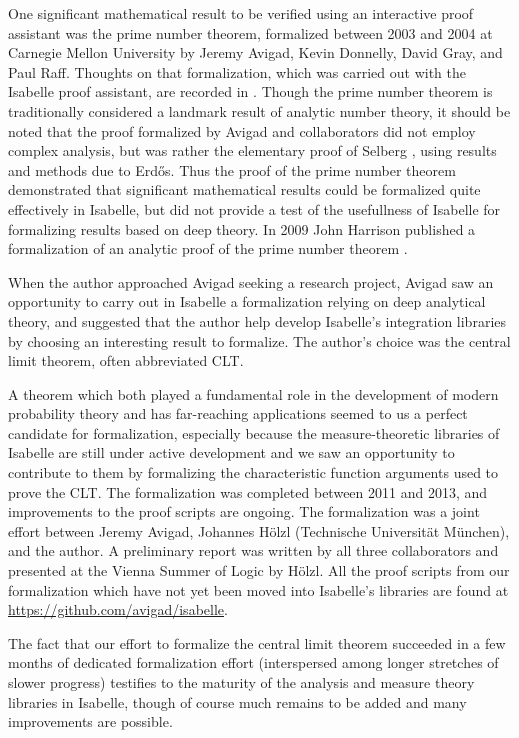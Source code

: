 \documentclass[leqno]{article}
\theoremstyle{definition}
\begin{document}
One significant mathematical result to be verified using an interactive proof assistant was the prime number theorem, formalized between 2003 and 2004 at Carnegie Mellon University by Jeremy Avigad, Kevin Donnelly, David Gray, and Paul Raff. Thoughts on that formalization, which was carried out with the Isabelle proof assistant, are recorded in \cite{avigad-etal-pnt}. Though the prime number theorem is traditionally considered a landmark result of analytic number theory, it should be noted that the proof formalized by Avigad and collaborators did not employ complex analysis, but was rather the elementary proof of Selberg \cite{selberg-pnt}, using results and methods due to Erd{\H{o}}s. Thus the proof of the prime number theorem demonstrated that significant mathematical results could be formalized quite effectively in Isabelle, but did not provide a test of the usefullness of Isabelle for formalizing results based on deep theory. In 2009 John Harrison published a formalization of an analytic proof of the prime number theorem \cite{harrison-pnt}.

When the author approached Avigad seeking a research project, Avigad saw an opportunity to carry out in Isabelle a formalization relying on deep analytical theory, and suggested that the author help develop Isabelle's integration libraries by choosing an interesting result to formalize. The author's choice was the central limit theorem, often abbreviated CLT.

A theorem which both played a fundamental role in the development of modern probability theory and has far-reaching applications seemed to us a perfect candidate for formalization, especially because the measure-theoretic libraries of Isabelle are still under active development and we saw an opportunity to contribute to them by formalizing the characteristic function arguments used to prove the CLT. The formalization was completed between 2011 and 2013, and improvements to the proof scripts are ongoing. The formalization was a joint effort between Jeremy Avigad, Johannes H\"olzl (Technische Universit\"at M\"unchen), and the author. A preliminary report \cite{prelim} was written by all three collaborators and presented at the Vienna Summer of Logic by H\"olzl.
All the proof scripts from our formalization which have not yet been moved into Isabelle's libraries are found at \url{https://github.com/avigad/isabelle}.

The fact that our effort to formalize the central limit theorem succeeded in a few months of dedicated formalization effort (interspersed among longer stretches of slower progress) testifies to the maturity of the analysis and measure theory libraries in Isabelle, though of course much remains to be added and many improvements are possible.
\end{document}
